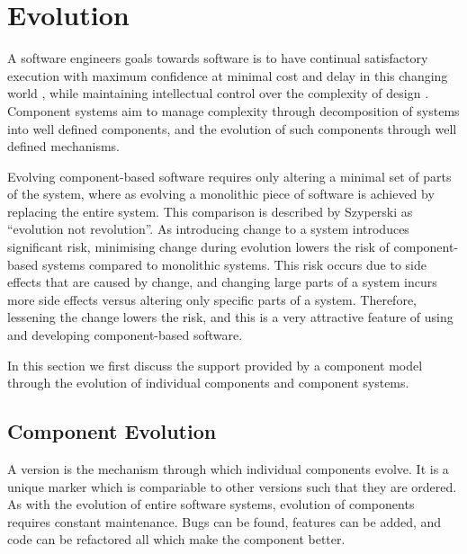 \section{Evolution}
\label{background.evolution}
{}A software engineers goals towards software is to have continual satisfactory execution with maximum confidence at minimal cost and delay in this changing world \cite{Lehman2006}, 
{}while maintaining intellectual control over the complexity of design \cite{Brooks1975}.
{}Component systems aim to manage complexity through decomposition of systems into well defined components, and the evolution of such components through well defined mechanisms.

Evolving component-based software requires only altering a minimal set of parts of the system, 
where as evolving a monolithic piece of software is achieved by replacing the entire system.
This comparison is described by Szyperski \cite{Szyperski2002} as ``evolution not revolution''.
As introducing change to a system introduces significant risk,
minimising change during evolution lowers the risk of component-based systems compared to monolithic systems. 
This risk occurs due to side effects that are caused by change, 
and changing large parts of a system incurs more side effects versus altering only specific parts of a system.
Therefore, lessening the change lowers the risk, and this is a very attractive feature of using and developing component-based software.


{}In this section we first discuss the support provided by a component model through the evolution of individual components and component systems.

\subsection{Component Evolution}


A version is the mechanism through which individual components evolve.
It is a unique marker which is compariable to other versions such that they are ordered.
As with the evolution of entire software systems, evolution of components requires constant maintenance.
Bugs can be found, features can be added, and code can be refactored all which make the component better.

